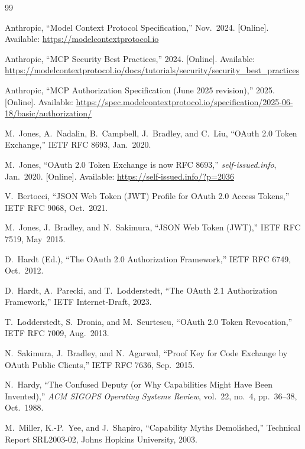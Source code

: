 \documentclass[journal]{IEEEtran}
\begin{document}
\begin{thebibliography}{99}

Anthropic, ``Model Context Protocol Specification,'' Nov.\ 2024.
[Online]. Available: \url{https://modelcontextprotocol.io}

Anthropic, ``MCP Security Best Practices,'' 2024.
[Online]. Available:
\url{https://modelcontextprotocol.io/docs/tutorials/security/security_best_practices}

Anthropic, ``MCP Authorization Specification (June 2025 revision),'' 2025.
[Online]. Available:
\url{https://spec.modelcontextprotocol.io/specification/2025-06-18/basic/authorization/}

M.\ Jones, A.\ Nadalin, B.\ Campbell, J.\ Bradley, and C.\ Liu,
``OAuth 2.0 Token Exchange,'' IETF RFC 8693, Jan.\ 2020.

M.\ Jones, ``OAuth 2.0 Token Exchange is now RFC 8693,''
\textit{self-issued.info}, Jan.\ 2020.
[Online]. Available: \url{https://self-issued.info/?p=2036}

V.\ Bertocci,
``JSON Web Token (JWT) Profile for OAuth 2.0 Access Tokens,''
IETF RFC 9068, Oct.\ 2021.

M.\ Jones, J.\ Bradley, and N.\ Sakimura,
``JSON Web Token (JWT),'' IETF RFC 7519, May\ 2015.

D.\ Hardt (Ed.),
``The OAuth 2.0 Authorization Framework,'' IETF RFC 6749, Oct.\ 2012.

D.\ Hardt, A.\ Parecki, and T.\ Lodderstedt,
``The OAuth 2.1 Authorization Framework,''
IETF Internet-Draft, 2023.

T.\ Lodderstedt, S.\ Dronia, and M.\ Scurtescu,
``OAuth 2.0 Token Revocation,'' IETF RFC 7009, Aug.\ 2013.

N.\ Sakimura, J.\ Bradley, and N.\ Agarwal,
``Proof Key for Code Exchange by OAuth Public Clients,''
IETF RFC 7636, Sep.\ 2015.

N.\ Hardy,
``The Confused Deputy (or Why Capabilities Might Have Been Invented),''
\textit{ACM SIGOPS Operating Systems Review},
vol.\ 22, no.\ 4, pp.\ 36--38, Oct.\ 1988.

M.\ Miller, K.-P.\ Yee, and J.\ Shapiro,
``Capability Myths Demolished,''
Technical Report SRL2003-02, Johns Hopkins University, 2003.


\end{thebibliography}
\end{document}
